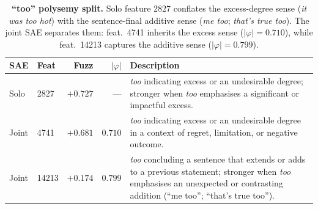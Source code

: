 
\begin{table}[t]
\centering
\caption{\textbf{``too'' polysemy split.} Solo feature 2827 conflates the
excess-degree sense (\textit{it was too hot}) with the sentence-final additive
sense (\textit{me too}; \textit{that's true too}).  The joint SAE separates
them: feat.\ 4741 inherits the excess sense ($|\varphi|=0.710$), while
feat.\ 14213 captures the additive sense ($|\varphi|=0.799$).}
\label{tab:qual_too}
\small
\begin{tabular}{llrrl}
\toprule
SAE & Feat & Fuzz & $|\varphi|$ & Description \\
\midrule
Solo & 2827 & $+0.727$ & — &
  \textit{too} indicating excess or an undesirable degree;
  stronger when \textit{too} emphasises a significant or impactful excess. \\[4pt]
\midrule
Joint & 4741 & $+0.681$ & $0.710$ &
  \textit{too} indicating excess or an undesirable degree in a context of
  regret, limitation, or negative outcome. \\[3pt]
Joint & 14213 & $+0.174$ & $0.799$ &
  \textit{too} concluding a sentence that extends or adds to a previous
  statement; stronger when \textit{too} emphasises an unexpected or
  contrasting addition (``me too''; ``that's true too''). \\
\bottomrule
\end{tabular}
\end{table}

